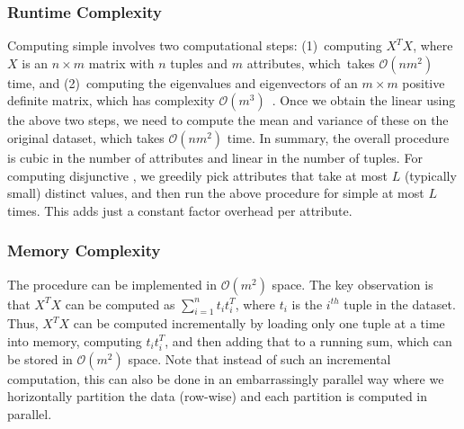 \subsubsection{Runtime Complexity} Computing simple \invariants
involves two computational steps: (1)~computing $X^TX$, where $X$ is an
$n\times m$ matrix with $n$ tuples and $m$ attributes, which~takes
$\mathcal{O}(nm^2)$ time, and (2)~computing the eigenvalues and eigenvectors of
an $m\times m$ positive definite matrix, which has complexity
$\mathcal{O}(m^3)$~\cite{DBLP:conf/stoc/PanC99}. Once we obtain the linear
\views using the above two steps, we need to compute the mean and variance of
these \views on the original dataset, which takes $\mathcal{O}(nm^2)$ time. In
summary, the overall procedure is cubic in the number of attributes and linear
in the number of tuples.
%
For computing disjunctive \invariants, we greedily pick attributes that take at
most $L$ (typically small) distinct values, and then run the above procedure
for simple \invariants at most $L$ times. This adds just a constant factor
overhead per attribute.

\subsubsection{Memory Complexity} The procedure can be implemented in
$\mathcal{O}(m^2)$ space. The key observation is that $X^T X$ can be computed
as $\sum_{i=1}^{n} t_i t_i^T$, where $t_i$ is the $i^{th}$ tuple in the
dataset. Thus, $X^TX$ can be computed incrementally by loading only one tuple
at a time into memory, computing $t_i t_i^T$, and then adding that to a running
sum, which can be stored in $\mathcal{O}(m^2)$ space. Note that instead of such
an incremental computation, this can also be done in an embarrassingly parallel
way where we horizontally partition the data (row-wise) and each partition is
computed in parallel.


